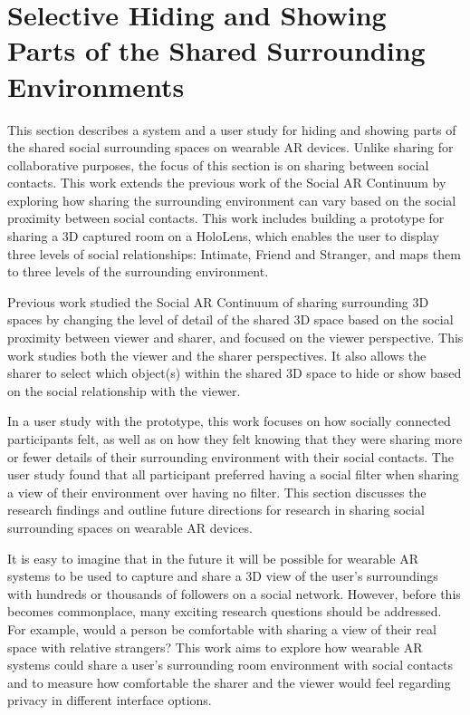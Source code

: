 \section{Selective Hiding and Showing Parts of the Shared Surrounding Environments}
\label{sec:surrounding:hiding}

This section describes a system and a user study for hiding and showing parts of the shared social surrounding spaces on wearable AR devices. Unlike sharing for collaborative purposes, the focus of this section is on sharing between social contacts. This work extends the previous work of the Social AR Continuum by exploring how sharing the surrounding environment can vary based on the social proximity between social contacts. This work includes building a prototype for sharing a 3D captured room on a HoloLens, which enables the user to display three levels of social relationships: Intimate, Friend and Stranger, and maps them to three levels of the surrounding environment.

Previous work studied the Social AR Continuum of sharing surrounding 3D spaces by changing the level of detail of the shared 3D space based on the social proximity between viewer and sharer, and focused on the viewer perspective. This work studies both the viewer and the sharer perspectives. It also allows the sharer to select which object(s) within the shared 3D space to hide or show based on the social relationship with the viewer. 

In a user study with the prototype, this work focuses on how socially connected participants felt, as well as on how they felt knowing that they were sharing more or fewer details of their surrounding environment with their social contacts. The user study found that all participant preferred having a social filter when sharing a view of their environment over having no filter. This section discusses the research findings and outline future directions for research in sharing social surrounding spaces on wearable AR devices. 


It is easy to imagine that in the future it will be possible for wearable AR systems to be used to capture and share a 3D view of the user's surroundings with hundreds or thousands of followers on a social network. However, before this becomes commonplace, many exciting research questions should be addressed. For example, would a person be comfortable with sharing a view of their real space with relative strangers? This work aims to explore how wearable AR systems could share a user's surrounding room environment with social contacts and to measure how comfortable the sharer and the viewer would feel regarding privacy in different interface options. 

